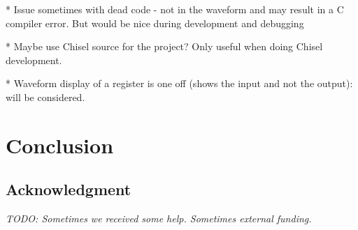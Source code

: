 \documentclass[a4paper, conference]{IEEEtran}
\newcommand{\todo}[1]{{\emph{TODO: #1}}}
\begin{document}
* Issue sometimes with dead code - not in the waveform and may
result in a C compiler error. But would be nice during development and debugging

* Maybe use Chisel source for the project? Only useful when doing Chisel development.

* Waveform display of a register is one off (shows the input and not the output):
will be considered.

\section{Conclusion}
\label{sec:conclusion}


\subsection*{Acknowledgment}

\todo{Sometimes we received some help. Sometimes external funding.}




%


\end{document}

